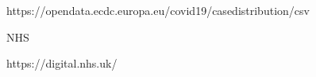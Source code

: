 https://opendata.ecdc.europa.eu/covid19/casedistribution/csv

NHS

https://digital.nhs.uk/











